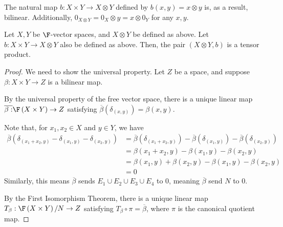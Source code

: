\documentclass[10pt]{mypackage}
\begin{document}
The natural map $b: X\times Y\rightarrow X\otimes Y$ defined by $b\left(x,y\right) = x\otimes y$ is, as a result, bilinear. Additionally, $0_{X\otimes Y} = 0_{X}\otimes y = x\otimes 0_{Y}$ for any $x,y$.
\begin{proposition}
  Let $X,Y$ be $\F$-vector spaces, and $X\otimes Y$ be defined as above. Let $b: X\times Y\rightarrow X\otimes Y$ also be defined as above. Then, the pair $\left(X\otimes Y, b\right)$ is a tensor product.
\end{proposition}
\begin{proof}
  We need to show the universal property. Let $Z$ be a space, and suppose $\beta: X\times Y \rightarrow Z$ is a bilinear map.\newline

  By the universal property of the free vector space, there is a unique linear map $\overline{\beta:} \F\left(X\times Y\right)\rightarrow Z$ satisfying $\overline{\beta}\left(\delta_{\left(x,y\right)}\right) = \beta\left(x,y\right)$.\newline

  Note that, for $x_1,x_2\in X$ and $y\in Y$, we have
  \begin{align*}
    \overline{\beta}\left(\delta_{\left(x_1+x_2,y\right)} - \delta_{\left(x_1,y\right)} - \delta_{\left(x_2,y\right)}\right) &= \overline{\beta}\left(\delta_{\left(x_1+x_2,y\right)}\right) - \overline{\beta}\left(\delta_{\left(x_1,y\right)}\right) - \overline{\beta}\left(\delta_{\left(x_2,y\right)}\right)\\
                                                                                                                             &= \beta\left(x_1 + x_2,y\right) - \beta\left(x_1,y\right) - \beta\left(x_2,y\right)\\
                                                                                                                             &= \beta\left(x_1,y\right) + \beta\left(x_2,y\right) - \beta\left(x_1,y\right) - \beta\left(x_2,y\right)\\
                                                                                                                             &= 0
  \end{align*}
  Similarly, this means $\overline{\beta}$ sends $E_1\cup E_2\cup E_3 \cup E_4$ to $0$, meaning $\overline{\beta}$ send $N$ to $0$.\newline

  By the First Isomorphism Theorem, there is a unique linear map $T_{\beta}: \F\left(X\times Y\right)/N\rightarrow Z$ satisfying $T_{\beta}\circ \pi = \overline{\beta}$, where $\pi$ is the canonical quotient map.\newline


\end{proof}
\end{document}
